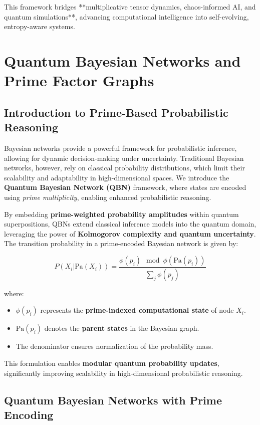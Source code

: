 \documentclass{article}
\theoremstyle{plain}
\theoremstyle{plain}
\theoremstyle{definition}
\theoremstyle{remark}
\begin{document}
This framework bridges **multiplicative tensor dynamics, chaos-informed AI, and quantum simulations**, advancing computational intelligence into self-evolving, entropy-aware systems.
\section{Quantum Bayesian Networks and Prime Factor Graphs}

\subsection{Introduction to Prime-Based Probabilistic Reasoning}

Bayesian networks provide a powerful framework for probabilistic inference, allowing for dynamic decision-making under uncertainty. Traditional Bayesian networks, however, rely on classical probability distributions, which limit their scalability and adaptability in high-dimensional spaces. We introduce the \textbf{Quantum Bayesian Network (QBN)} framework, where states are encoded using \textit{prime multiplicity}, enabling enhanced probabilistic reasoning.

By embedding \textbf{prime-weighted probability amplitudes} within quantum superpositions, QBNs extend classical inference models into the quantum domain, leveraging the power of \textbf{Kolmogorov complexity and quantum uncertainty}. The transition probability in a prime-encoded Bayesian network is given by:

\begin{equation}
P(X_i | \text{Pa}(X_i)) = \frac{\phi(p_i) \mod \phi(\text{Pa}(p_i))}{\sum_{j} \phi(p_j)}
\end{equation}

where:
\begin{itemize}
    \item $\phi(p_i)$ represents the \textbf{prime-indexed computational state} of node $X_i$.
    \item $\text{Pa}(p_i)$ denotes the \textbf{parent states} in the Bayesian graph.
    \item The denominator ensures normalization of the probability mass.
\end{itemize}

This formulation enables \textbf{modular quantum probability updates}, significantly improving scalability in high-dimensional probabilistic reasoning.

\subsection{Quantum Bayesian Networks with Prime Encoding}
\end{document}
